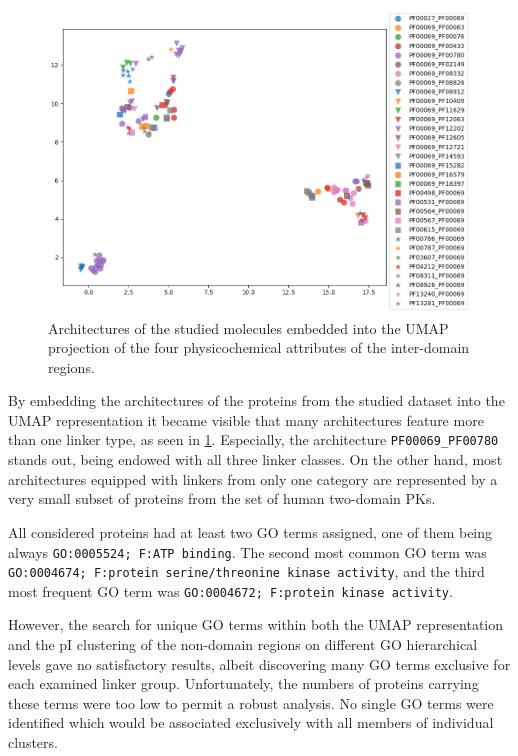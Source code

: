 		\begin{figure}
			\centering
			\includegraphics[width=\linewidth]{img/linker_umap_arch.png}
			\caption{Architectures of the studied molecules embedded into the UMAP projection
			of the four physicochemical attributes of the inter-domain regions.}
			\label{fig:umap_arch}
		\end{figure}

		By embedding the architectures of the proteins from the studied dataset into the UMAP
		representation it became visible that many architectures feature more than one linker
		type, as seen in \cref{fig:umap_arch}.
		Especially, the architecture \texttt{PF00069\_PF00780} stands out, being endowed with
		all three linker classes.
		On the other hand, most architectures equipped with linkers from only one category
		are represented by a very small subset of proteins from the set of human two-domain
		PKs.

	\label{res:first:go}

		All considered proteins had at least two GO terms assigned, one of them being always
		\texttt{GO:0005524; F:ATP binding}.
		The second most common GO term was \texttt{GO:0004674; F:protein serine/threonine
		kinase activity}, and the third most frequent GO term was \texttt{GO:0004672;
		F:protein kinase activity}.

		However, the search for unique GO terms within both the UMAP representation and the pI
		clustering of the non-domain regions on different GO hierarchical levels gave no
		satisfactory results, albeit discovering many GO terms exclusive for each examined
		linker group.
		Unfortunately, the numbers of proteins carrying these terms were too low to permit a
		robust analysis.
		No single GO terms were identified which would be associated exclusively with all members of individual clusters.

